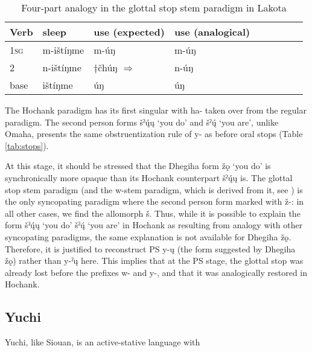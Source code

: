 \documentclass[oneside,a4paper,11pt]{article}
\newcommand{\ipa}[1]{{\phon#1}} %
\begin{document}
\begin{table}[H]
\caption{Four-part analogy in the glottal stop stem paradigm in Lakota} \label{tab:analogy.glottal} \centering
\begin{tabular}{lllllllll}
\toprule
Verb & sleep & use (expected) & use (analogical) \\
\midrule
\textsc{1sg} &\ipa{m-ištíŋme} &\ipa{m-úŋ} &\ipa{m-úŋ} &\\
2 & 	\ipa{n-ištíŋme}&$\dagger$\ipa{čhúŋ} $\Rightarrow$ &\ipa{n-úŋ} &  \\ 
base & \ipa{ištíŋme}	 &\ipa{úŋ} &\ipa{úŋ} & 	\\
\bottomrule
\end{tabular}
\end{table}

The Hochank paradigm has its first singular with \ipa{ha-} taken over from the regular paradigm. The second person forms \ipa{šˀų́ų} `you do' and \ipa{šˀų́} `you are', unlike Omaha, presents the same obstruentization rule of \ipa{*y-} as before oral stops (Table \ref{tab:stops}).

At this stage, it should be stressed that the Dhegiha form \ipa{žǫ} `you do' is synchronically more opaque than its Hochank counterpart \ipa{šˀų́ų} is. The glottal stop stem paradigm (and the w-stem paradigm, which is derived from it, see \citealt[496]{rankin05quapaw}) is the only syncopating paradigm where the second person form marked with \ipa{ž-}: in all other cases, we find the allomorph \ipa{š}. Thus, while it is possible to explain the form \ipa{šˀų́ų} `you do' \ipa{šˀų́} `you are' in Hochank as resulting from analogy with other syncopating paradigms, the same explanation is not available for Dhegiha \ipa{žǫ}. Therefore, it is justified to reconstruct PS \ipa{*y-ų} (the form suggested by Dhegiha \ipa{žǫ}) rather than \ipa{*y-ˀų} here. This implies that at the PS stage, the glottal stop was already lost before the prefixes \ipa{*w-} and \ipa{*y-}, and that it was analogically restored in Hochank.

\subsection{Yuchi}
Yuchi, like Siouan, is an active-stative language with 
\end{document}
